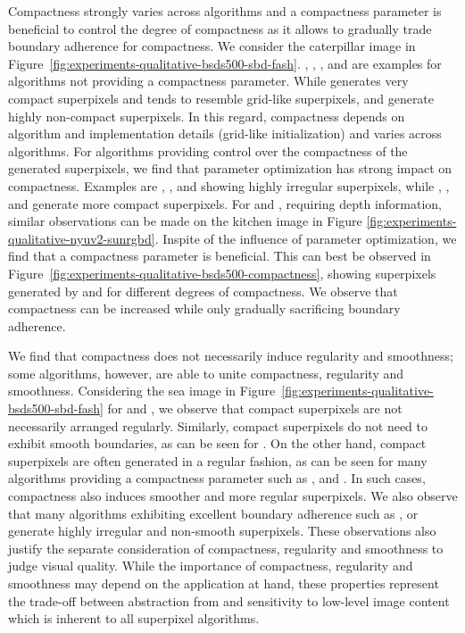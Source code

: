 
Compactness strongly varies across algorithms and a compactness parameter
is beneficial to control the degree of compactness as it allows to gradually trade boundary adherence for compactness.
We consider the caterpillar image in Figure~\ref{fig:experiments-qualitative-bsds500-sbd-fash}.
\TP, \RW, \W, and \PF are examples for algorithms not providing a compactness parameter.
While \TP generates very compact superpixels and \RW tends to resemble grid-like superpixels, \W and \PF generate highly
non-compact superpixels. In this regard, compactness depends on algorithm and
implementation details (\eg grid-like initialization) and varies across algorithms.
For algorithms providing control over the compactness of the generated superpixels,
we find that parameter optimization has strong impact on compactness.
Examples are \CRS, \LSC, \ETPS and \ERGC showing highly irregular superpixels,
while \SLIC, \CCS, \VC and \WP generate more compact superpixels.
For \DASP and \VCCS, requiring depth information, similar observations can be made
on the kitchen image in Figure \ref{fig:experiments-qualitative-nyuv2-sunrgbd}.
Inspite of the influence of parameter optimization, we find that a compactness parameter
is beneficial. This can best be observed in Figure~\ref{fig:experiments-qualitative-bsds500-compactness}, showing superpixels
generated by \SLIC and \CRS for different degrees of compactness. We observe that compactness
can be increased while only gradually sacrificing boundary adherence.

We find that compactness does not necessarily induce regularity and smoothness;
some algorithms, however, are able to unite compactness, regularity and smoothness.
Considering the sea image in Figure~\ref{fig:experiments-qualitative-bsds500-sbd-fash}
for \CIS and \TP, we observe that compact superpixels are not necessarily arranged regularly.
Similarly, compact superpixels do not need to exhibit smooth boundaries, as can be seen for \PB.
On the other hand, compact superpixels are often generated in a regular fashion,
as can be seen for many algorithms providing a compactness parameter such as \SLIC, \VC and \CCS.
In such cases, compactness also induces smoother and more regular superpixels.
We also observe that many algorithms exhibiting excellent boundary adherence such
as \CRS, \SEEDS or \ETPS generate highly irregular and non-smooth superpixels.
These observations also justify the separate consideration of compactness,
regularity and smoothness to judge visual quality.
While the importance of compactness, regularity and smoothness may depend on the
application at hand, these properties represent the trade-off between
abstraction from and sensitivity to low-level image content which
is inherent to all superpixel algorithms.

